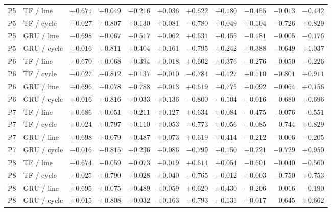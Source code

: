 \begin{tabular}{llrrrrrrrrr}
P5 & TF / line & $+0.671$ & $+0.049$ & $+0.216$ & $+0.036$ & $+0.622$ & $+0.180$ & $-0.455$ & $-0.013$ & $-0.442$ \\
P5 & TF / cycle & $+0.027$ & $+0.807$ & $+0.130$ & $+0.081$ & $-0.780$ & $+0.049$ & $+0.104$ & $-0.726$ & $+0.829$ \\
P5 & GRU / line & $+0.698$ & $+0.067$ & $+0.517$ & $+0.062$ & $+0.631$ & $+0.455$ & $-0.181$ & $-0.005$ & $-0.176$ \\
P5 & GRU / cycle & $+0.016$ & $+0.811$ & $+0.404$ & $+0.161$ & $-0.795$ & $+0.242$ & $+0.388$ & $-0.649$ & $+1.037$ \\
P6 & TF / line & $+0.670$ & $+0.068$ & $+0.394$ & $+0.018$ & $+0.602$ & $+0.376$ & $-0.276$ & $-0.050$ & $-0.226$ \\
P6 & TF / cycle & $+0.027$ & $+0.812$ & $+0.137$ & $+0.010$ & $-0.784$ & $+0.127$ & $+0.110$ & $-0.801$ & $+0.911$ \\
P6 & GRU / line & $+0.696$ & $+0.078$ & $+0.788$ & $+0.013$ & $+0.619$ & $+0.775$ & $+0.092$ & $-0.064$ & $+0.156$ \\
P6 & GRU / cycle & $+0.016$ & $+0.816$ & $+0.033$ & $+0.136$ & $-0.800$ & $-0.104$ & $+0.016$ & $-0.680$ & $+0.696$ \\
P7 & TF / line & $+0.686$ & $+0.051$ & $+0.211$ & $+0.127$ & $+0.634$ & $+0.084$ & $-0.475$ & $+0.076$ & $-0.551$ \\
P7 & TF / cycle & $+0.024$ & $+0.797$ & $+0.110$ & $+0.053$ & $-0.773$ & $+0.056$ & $+0.085$ & $-0.744$ & $+0.829$ \\
P7 & GRU / line & $+0.698$ & $+0.079$ & $+0.487$ & $+0.073$ & $+0.619$ & $+0.414$ & $-0.212$ & $-0.006$ & $-0.205$ \\
P7 & GRU / cycle & $+0.016$ & $+0.815$ & $+0.236$ & $+0.086$ & $-0.799$ & $+0.150$ & $+0.221$ & $-0.729$ & $+0.950$ \\
P8 & TF / line & $+0.674$ & $+0.059$ & $+0.073$ & $+0.019$ & $+0.614$ & $+0.054$ & $-0.601$ & $-0.040$ & $-0.560$ \\
P8 & TF / cycle & $+0.025$ & $+0.790$ & $+0.028$ & $+0.040$ & $-0.765$ & $-0.012$ & $+0.003$ & $-0.750$ & $+0.753$ \\
P8 & GRU / line & $+0.695$ & $+0.075$ & $+0.489$ & $+0.059$ & $+0.620$ & $+0.430$ & $-0.206$ & $-0.016$ & $-0.190$ \\
P8 & GRU / cycle & $+0.015$ & $+0.808$ & $+0.032$ & $+0.163$ & $-0.793$ & $-0.131$ & $+0.017$ & $-0.645$ & $+0.662$ \\
\bottomrule
\end{tabular}
